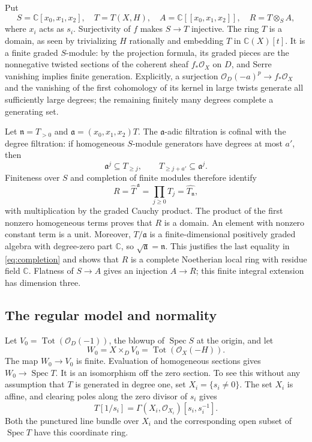 \documentclass[11pt]{article}
\theoremstyle{remark}
\newcommand{\C}{\mathbb C}
\newcommand{\cO}{\mathcal O}
\DeclareMathOperator{\Spec}{Spec}
\DeclareMathOperator{\Tot}{Tot}
\begin{document}
Put
\[
 S=\C[x_0,x_1,x_2],\quad T=T(X,H),\quad
 A=\C[[x_0,x_1,x_2]],\quad R=T\otimes_S A,
\]
where $x_i$ acts as $s_i$. Surjectivity of $f$ makes $S\to T$ injective.
The ring $T$ is a domain, as seen by trivializing $H$ rationally and
embedding $T$ in $\C(X)[t]$. It is a finite graded $S$-module: by the
projection formula, its graded pieces are the nonnegative twisted
sections of the coherent sheaf $f_*\cO_X$ on $D$, and Serre vanishing
implies finite generation. Explicitly, a surjection
$\cO_D(-a)^p\to f_*\cO_X$ and the vanishing of the first cohomology of its
kernel in large twists generate all sufficiently large degrees;
the remaining finitely many degrees complete a generating set.

Let $\mathfrak n=T_{>0}$ and $\mathfrak a=(x_0,x_1,x_2)T$.
The $\mathfrak a$-adic filtration is cofinal with the degree filtration:
if homogeneous $S$-module generators have degrees at most $a'$, then
\[
 \mathfrak a^j\subseteq T_{\geq j},\qquad
 T_{\geq j+a'}\subseteq\mathfrak a^j.
\]
Finiteness over $S$ and completion of finite modules
\cite[Tags~00MA and 00MB]{Stacks} therefore identify
\begin{equation}\label{eq:completion}
 R=\widehat T^{\,\mathfrak a}=\prod_{j\geq0}T_j
   =\widehat{T_{\mathfrak n}},
\end{equation}
with multiplication by the graded Cauchy product. The product of the
first nonzero homogeneous terms proves that $R$ is a domain. An element
with nonzero constant term is a unit. Moreover, $T/\mathfrak a$ is a
finite-dimensional positively graded algebra with degree-zero part
$\C$, so $\sqrt{\mathfrak a}=\mathfrak n$. This justifies the last equality
in \eqref{eq:completion} and shows that $R$ is a complete Noetherian
local ring with residue field $\C$. Flatness of $S\to A$ gives an
injection $A\to R$; this finite integral extension has dimension three.

\subsection{The regular model and normality}
Let $V_0=\Tot(\cO_D(-1))$, the blowup of $\Spec S$ at the origin, and
let
\[
 W_0=X\times_D V_0=\Tot(\cO_X(-H)).
\]
The map $W_0\to V_0$ is finite. Evaluation of homogeneous sections gives
$W_0\to\Spec T$. It is an isomorphism off the zero section. To see this
without any assumption that $T$ is generated in degree one, set
$X_i=\{s_i\ne0\}$. The set $X_i$ is affine, and clearing poles along
the zero divisor of $s_i$ gives
\[
 T[1/s_i]=\Gamma(X_i,\cO_{X_i})[s_i,s_i^{-1}].
\]
Both the punctured line bundle over $X_i$ and the corresponding open
subset of $\Spec T$ have this coordinate ring.
\end{document}
